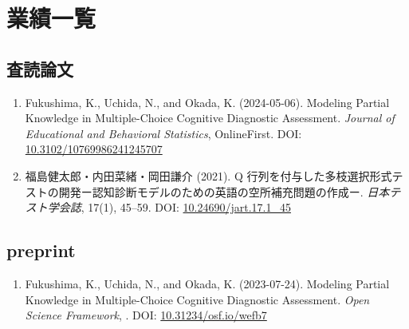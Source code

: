 \section*{業績一覧}

\subsection*{査読論文}
\begin{enumerate}
\item Fukushima, K., Uchida, N., and Okada, K. (2024-05-06). Modeling Partial Knowledge in Multiple-Choice Cognitive Diagnostic Assessment. \textit{Journal of Educational and Behavioral Statistics}, OnlineFirst. DOI: \href{https://doi.org/10.3102/10769986241245707}{10.3102/10769986241245707}
\item 福島健太郎・内田菜緒・岡田謙介 (2021). Q 行列を付与した多枝選択形式テストの開発ー認知診断モデルのための英語の空所補充問題の作成ー. \textit{日本テスト学会誌}, 17(1), 45--59. DOI: \href{https://doi.org/10.24690/jart.17.1_45}{10.24690/jart.17.1_45}
\end{enumerate}

\subsection*{preprint}
\begin{enumerate}
\item Fukushima, K., Uchida, N., and Okada, K. (2023-07-24). Modeling Partial Knowledge in Multiple-Choice Cognitive Diagnostic Assessment. \textit{Open Science Framework}, . DOI: \href{https://doi.org/10.31234/osf.io/wefb7}{10.31234/osf.io/wefb7}
\end{enumerate}

